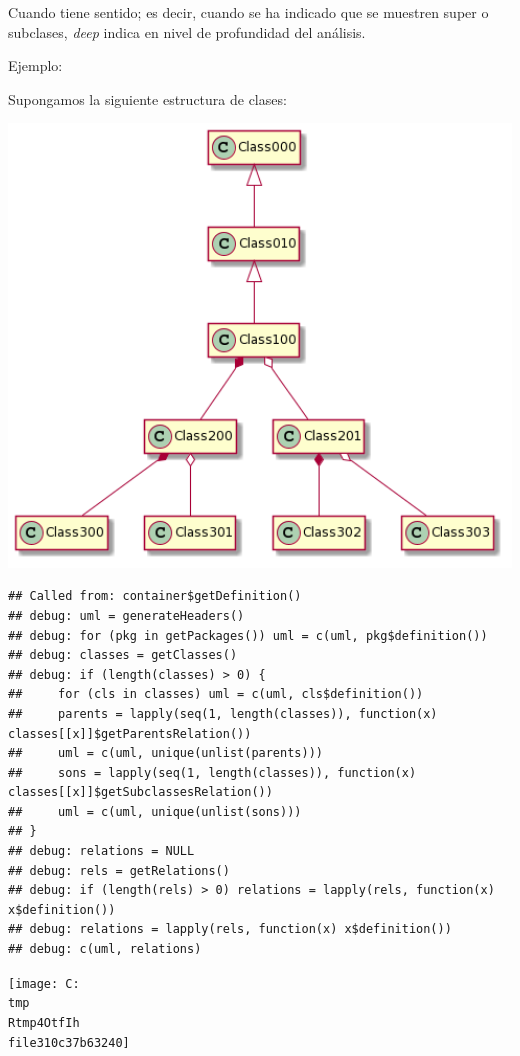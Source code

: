 \documentclass[
]{article}
\begin{document}
Cuando tiene sentido; es decir, cuando se ha indicado que se muestren
super o subclases, \emph{deep} indica en nivel de profundidad del
análisis.

Ejemplo:

Supongamos la siguiente estructura de clases:

\includegraphics[width=6.69in]{../vignettes/img/jerarquia}

\begin{verbatim}
## Called from: container$getDefinition()
## debug: uml = generateHeaders()
## debug: for (pkg in getPackages()) uml = c(uml, pkg$definition())
## debug: classes = getClasses()
## debug: if (length(classes) > 0) {
##     for (cls in classes) uml = c(uml, cls$definition())
##     parents = lapply(seq(1, length(classes)), function(x) classes[[x]]$getParentsRelation())
##     uml = c(uml, unique(unlist(parents)))
##     sons = lapply(seq(1, length(classes)), function(x) classes[[x]]$getSubclassesRelation())
##     uml = c(uml, unique(unlist(sons)))
## }
## debug: relations = NULL
## debug: rels = getRelations()
## debug: if (length(rels) > 0) relations = lapply(rels, function(x) x$definition())
## debug: relations = lapply(rels, function(x) x$definition())
## debug: c(uml, relations)
\end{verbatim}

\texttt{[image: C:\\tmp\\Rtmp4OtfIh\\file310c37b63240]}
\end{document}
